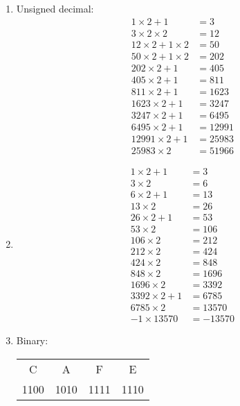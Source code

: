 \documentclass[11pt]{article}
\begin{document}
\begin{enumerate}
\begin{enumerate}
\item Unsigned decimal:
\begin{align*}
	1\times 2 + 1 &= 3\\
	3\times 2\times 2 &= 12\\
	12\times2+1\times2&=50\\
	50\times2+1\times2&=202\\
	202\times2+1 &= 405\\
	405\times2+1 &= 811\\
	811\times2+1&=1623\\
	1623\times2+1&=3247\\
	3247\times2+1&=6495\\
	6495\times2+1&=12991\\
	12991\times2+1&= 25983\\
	25983\times2&=\boxed{51966}
\end{align*}
\item {}\linebreak
{}\linebreak
{}\linebreak
{}
\begin{align*}
	1\times2+1 &= 3\\
	3\times2&=6\\
	6\times2+1&=13\\
	13\times2&=26\\
	26\times2+1&=53\\
	53\times2&=106\\
	106\times2&=212\\
	212\times2&=424\\
	424\times2&=848\\
	848\times2&=1696\\
	1696\times2&=3392\\
	3392\times2+1&=6785\\
	6785\times2&=13570\\
	-1\times13570&=\boxed{-13570}
\end{align*}
\item Binary: \linebreak
\begin{tabular}{c c c c}
C & A & F & E \\
1100 & 1010 & 1111 & 1110
\end{tabular}\linebreak
{}
\end{enumerate}


\end{enumerate}
\end{document}
